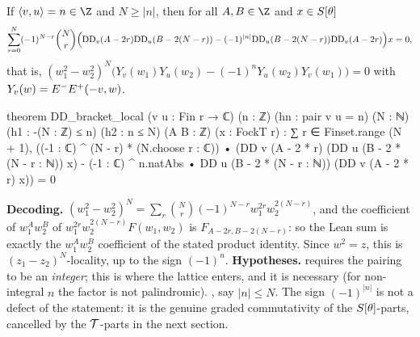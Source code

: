 \begin{theorem}\label{ch08:thm:DDlocal}
If $\cheightpair vu=n\in\Z$ and $N\ge|n|$, then for all $A,B\in\Z$ and $x\in S[\theta]$
\begin{equation*}
  \sum_{r=0}^{N}(-1)^{N-r}\binom Nr\Bigl(\mathrm{DD}_v(A-2r)\mathrm{DD}_u(B-2(N-r))
  -(-1)^{|n|}\mathrm{DD}_u(B-2(N-r))\mathrm{DD}_v(A-2r)\Bigr)x=0,
\end{equation*}
that is, $(w_1^2-w_2^2)^N\bigl(Y_v(w_1)Y_u(w_2)-(-1)^nY_u(w_2)Y_v(w_1)\bigr)=0$ with
$Y_v(w)=E^{-}E^{+}(-v,w)$.
\end{theorem}
\begin{leancode}
theorem DD_bracket_local (v u : Fin r → ℂ) (n : ℤ) (hn : pair v u = n) (N : ℕ)
    (h1 : -(N : ℤ) ≤ n) (h2 : n ≤ N) (A B : ℤ) (x : FockT r) :
    ∑ r ∈ Finset.range (N + 1), ((-1 : ℂ) ^ (N - r) * (N.choose r : ℂ)) •
      (DD v (A - 2 * r) (DD u (B - 2 * (N - r : ℕ)) x)
        - (-1 : ℂ) ^ n.natAbs • DD u (B - 2 * (N - r : ℕ)) (DD v (A - 2 * r) x)) = 0
\end{leancode}
\begin{dictionary}
\textbf{Decoding.}  $(w_1^2-w_2^2)^N=\sum_r\binom Nr(-1)^{N-r}w_1^{2r}w_2^{2(N-r)}$, and the
coefficient of $w_1^Aw_2^B$ of $w_1^{2r}w_2^{2(N-r)}F(w_1,w_2)$ is $F_{A-2r,B-2(N-r)}$: so the Lean sum
is exactly the $w_1^Aw_2^B$ coefficient of the stated product identity.  Since $w^2=z$, this is
$(z_1-z_2)^N$-locality, up to the sign $(-1)^n$.  \textbf{Hypotheses.}  requires the
pairing to be an \emph{integer}; this is where the lattice enters, and it is necessary (for
non-integral $n$ the factor is not palindromic).  ,  say $|n|\le N$.  The
sign $(-1)^{|n|}$ is not a defect of the statement: it is the genuine graded commutativity of the
$S[\theta]$-parts, cancelled by the $\mathcal{T}$-parts in the next section.
\end{dictionary}

